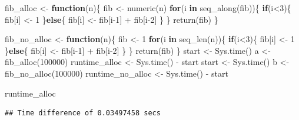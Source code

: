 \documentclass[
]{book}
\newenvironment{Shaded}{\begin{snugshade}}{\end{snugshade}}
\newcommand{\ControlFlowTok}[1]{\textcolor[rgb]{0.13,0.29,0.53}{\textbf{#1}}}
\newcommand{\DecValTok}[1]{\textcolor[rgb]{0.00,0.00,0.81}{#1}}
\newcommand{\FunctionTok}[1]{\textcolor[rgb]{0.00,0.00,0.00}{#1}}
\newcommand{\NormalTok}[1]{#1}
\newcommand{\OtherTok}[1]{\textcolor[rgb]{0.56,0.35,0.01}{#1}}
\newcommand{\SpecialCharTok}[1]{\textcolor[rgb]{0.00,0.00,0.00}{#1}}
\begin{document}
\begin{Shaded}
\begin{Highlighting}[]
\NormalTok{fib\_alloc }\OtherTok{\textless{}{-}} \ControlFlowTok{function}\NormalTok{(n)\{}
\NormalTok{  fib }\OtherTok{\textless{}{-}} \FunctionTok{numeric}\NormalTok{(n)}
  \ControlFlowTok{for}\NormalTok{(i }\ControlFlowTok{in} \FunctionTok{seq\_along}\NormalTok{(fib))\{}
    \ControlFlowTok{if}\NormalTok{(i}\SpecialCharTok{\textless{}}\DecValTok{3}\NormalTok{)\{ }
\NormalTok{      fib[i] }\OtherTok{\textless{}{-}} \DecValTok{1}
\NormalTok{    \}}\ControlFlowTok{else}\NormalTok{\{}
\NormalTok{      fib[i] }\OtherTok{\textless{}{-}}\NormalTok{ fib[i}\DecValTok{{-}1}\NormalTok{] }\SpecialCharTok{+}\NormalTok{ fib[i}\DecValTok{{-}2}\NormalTok{] }
\NormalTok{    \}}
\NormalTok{  \}}
  \FunctionTok{return}\NormalTok{(fib)}
\NormalTok{\}}


\NormalTok{fib\_no\_alloc }\OtherTok{\textless{}{-}} \ControlFlowTok{function}\NormalTok{(n)\{}
\NormalTok{  fib }\OtherTok{\textless{}{-}} \DecValTok{1}
  \ControlFlowTok{for}\NormalTok{(i }\ControlFlowTok{in} \FunctionTok{seq\_len}\NormalTok{(n))\{}
    \ControlFlowTok{if}\NormalTok{(i}\SpecialCharTok{\textless{}}\DecValTok{3}\NormalTok{)\{ }
\NormalTok{      fib[i] }\OtherTok{\textless{}{-}} \DecValTok{1}
\NormalTok{    \}}\ControlFlowTok{else}\NormalTok{\{}
\NormalTok{      fib[i] }\OtherTok{\textless{}{-}}\NormalTok{ fib[i}\DecValTok{{-}1}\NormalTok{] }\SpecialCharTok{+}\NormalTok{ fib[i}\DecValTok{{-}2}\NormalTok{] }
\NormalTok{    \}}
\NormalTok{  \}}
  \FunctionTok{return}\NormalTok{(fib)}
\NormalTok{\}}
\NormalTok{start }\OtherTok{\textless{}{-}} \FunctionTok{Sys.time}\NormalTok{()}
\NormalTok{a }\OtherTok{\textless{}{-}} \FunctionTok{fib\_alloc}\NormalTok{(}\DecValTok{100000}\NormalTok{)}
\NormalTok{runtime\_alloc }\OtherTok{\textless{}{-}} \FunctionTok{Sys.time}\NormalTok{() }\SpecialCharTok{{-}}\NormalTok{ start}
\NormalTok{start }\OtherTok{\textless{}{-}} \FunctionTok{Sys.time}\NormalTok{()}
\NormalTok{b }\OtherTok{\textless{}{-}} \FunctionTok{fib\_no\_alloc}\NormalTok{(}\DecValTok{100000}\NormalTok{)}
\NormalTok{runtime\_no\_alloc }\OtherTok{\textless{}{-}} \FunctionTok{Sys.time}\NormalTok{() }\SpecialCharTok{{-}}\NormalTok{ start}

\NormalTok{runtime\_alloc}
\end{Highlighting}
\end{Shaded}

\begin{verbatim}
## Time difference of 0.03497458 secs
\end{verbatim}
\end{document}
